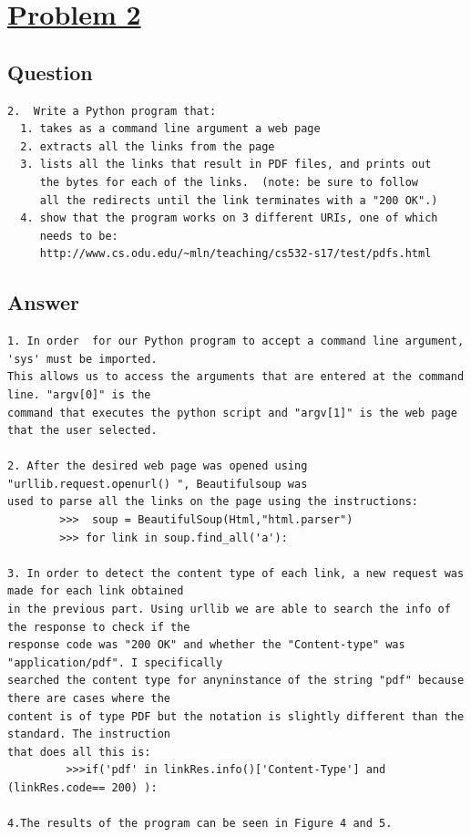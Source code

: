 \documentclass{article}
\begin{document}
\newpage



\section*{\underline{Problem 2}}

\subsection*{Question}

\begin{verbatim}
2.  Write a Python program that:
  1. takes as a command line argument a web page
  2. extracts all the links from the page
  3. lists all the links that result in PDF files, and prints out
     the bytes for each of the links.  (note: be sure to follow
     all the redirects until the link terminates with a "200 OK".)
  4. show that the program works on 3 different URIs, one of which
     needs to be: 
     http://www.cs.odu.edu/~mln/teaching/cs532-s17/test/pdfs.html
\end{verbatim}

\subsection*{Answer}


\begin{verbatim}
1. In order  for our Python program to accept a command line argument, 'sys' must be imported. 
This allows us to access the arguments that are entered at the command line. "argv[0]" is the 
command that executes the python script and "argv[1]" is the web page that the user selected.

2. After the desired web page was opened using "urllib.request.openurl() ", Beautifulsoup was
used to parse all the links on the page using the instructions: 
        >>>  soup = BeautifulSoup(Html,"html.parser")
        >>> for link in soup.find_all('a'):

3. In order to detect the content type of each link, a new request was made for each link obtained 
in the previous part. Using urllib we are able to search the info of the response to check if the
response code was "200 OK" and whether the "Content-type" was "application/pdf". I specifically 
searched the content type for anyninstance of the string "pdf" because there are cases where the 
content is of type PDF but the notation is slightly different than the standard. The instruction 
that does all this is: 
         >>>if('pdf' in linkRes.info()['Content-Type'] and (linkRes.code== 200) ):

4.The results of the program can be seen in Figure 4 and 5.
\end{verbatim}
\end{document}
